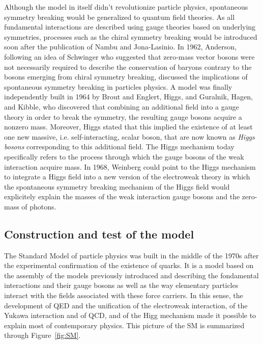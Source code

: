 	Although the model in itself didn't revolutionize particle physics, spontaneous symmetry breaking would be generalized to quantum field theories. As all fundamental interactions are described using gauge theories based on underlying symmetries, processes such as the chiral symmetry breaking would be introduced soon after the publication of Nambu and Jona-Lasinio. In 1962, Anderson, following an idea of Schwinger who suggested that zero-mass vector bosons were not necessarily required to describe the conservation of baryons contrary to the bosons emerging from chiral symmetry breaking, discussed the implications of spontaneous symmetry breaking in particles physics. A model was finally independently built in 1964 by Brout and Englert, Higgs, and Guralnik, Hagen, and Kibble, who discovered that combining an additional field into a gauge theory in order to break the symmetry, the resulting gauge bosons acquire a nonzero mass. Moreover, Higgs stated that this implied the existence of at least one new massive, i.e. self-interacting, scalar boson, that are now known as \textit{Higgs bosons} corresponding to this additional field. The Higgs mechanism today specifically refers to the process through which the gauge bosons of the weak interaction acquire mass. In 1968, Weinberg could point to the Higgs mechanism to integrate a Higgs field into a new version of the electroweak theory in which the spontaneous symmetry breaking mechanism of the Higgs field would explicitely explain the masses of the weak interaction gauge bosons and the zero-mass of photons.
	
	\subsection{Construction and test of the model}
	\label{chapt2:ssec:model}
	
	The Standard Model of particle physics was built in the middle of the 1970s after the experimental confirmation of the existence of quarks. It is a model based on the assembly of the models previously introduced and describing the fondamental interactions and their gauge bosons as well as the way elementary particles interact with the fields associated with these force carriers. In this sense, the development of QED and the unification of the electroweak interaction, of the Yukawa interaction and of QCD, and of the Higg mechanism made it possible to explain most of contemporary physics. This picture of the SM is summarized through Figure~\ref{fig:SM}.
	
